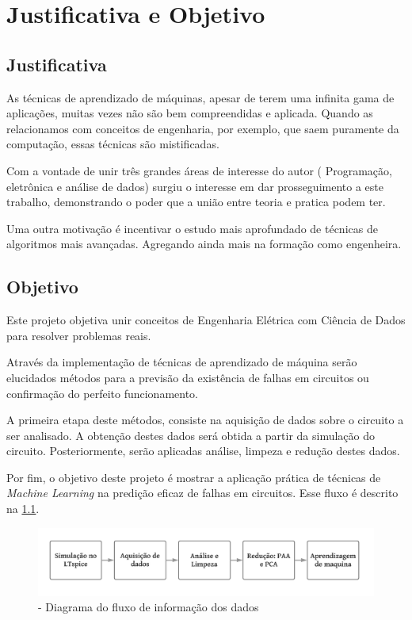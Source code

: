 \chapter{Justificativa e Objetivo}
\label{chapter:exemplo}

\section{\textbf{Justificativa}}
\label{sec:CapJustificativa}

As técnicas de aprendizado de máquinas, apesar de terem uma infinita gama de aplicações, muitas vezes não são bem compreendidas e aplicada. Quando as relacionamos com conceitos de engenharia, por exemplo, que saem puramente da computação, essas técnicas são mistificadas. 

Com a vontade de unir três grandes áreas de interesse do autor ( Programação, eletrônica e análise de dados) surgiu o interesse em dar prosseguimento a este trabalho, demonstrando o poder que a união entre teoria e pratica podem ter. 

Uma outra motivação é incentivar o estudo mais aprofundado de técnicas de algoritmos mais avançadas. Agregando ainda mais na formação como engenheira. 

\section{\textbf{Objetivo}}
\label{sec:CapObjetivo}

Este projeto objetiva unir conceitos de Engenharia Elétrica com Ciência de Dados para resolver problemas reais.

Através da implementação de técnicas de aprendizado de máquina serão elucidados métodos para a  previsão da existência de falhas em circuitos ou confirmação do perfeito funcionamento. 

A primeira etapa deste métodos, consiste na aquisição de dados sobre o circuito a ser analisado. A obtenção destes dados será obtida a partir da simulação do circuito. Posteriormente, serão aplicadas análise, limpeza e redução destes dados. 

Por fim, o objetivo deste projeto é mostrar a aplicação prática de técnicas de \textit{Machine Learning} na predição eficaz de falhas em circuitos. Esse fluxo é descrito na \ref{fig:diagrama}. 


\begin{figure}[H]
\begin{center}
\includegraphics[width=13cm]{./02_Cap1/figures/diagrama.PNG}
\caption{\label{fig:diagrama}- Diagrama do fluxo de informação dos dados}
\end{center}
\end{figure}



